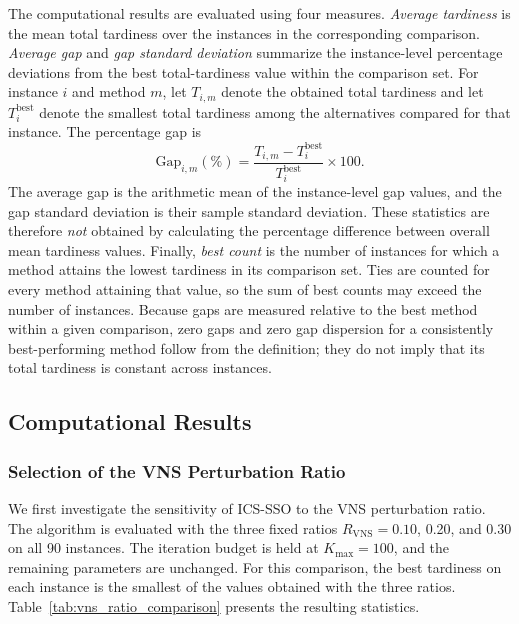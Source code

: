 \documentclass[11pt]{article}
\begin{document}
The computational results are evaluated using four measures. \emph{Average tardiness} is the mean total tardiness over the instances in the corresponding comparison. \emph{Average gap} and \emph{gap standard deviation} summarize the instance-level percentage deviations from the best total-tardiness value within the comparison set. For instance \(i\) and method \(m\), let \(T_{i,m}\) denote the obtained total tardiness and let \(T_i^{\mathrm{best}}\) denote the smallest total tardiness among the alternatives compared for that instance. The percentage gap is
\begin{equation}
\label{eq:gap}
\mathrm{Gap}_{i,m}(\%) = \frac{T_{i,m}-T_i^{\mathrm{best}}}{T_i^{\mathrm{best}}}\times 100.
\end{equation}
The average gap is the arithmetic mean of the instance-level gap values, and the gap standard deviation is their sample standard deviation. These statistics are therefore \emph{not} obtained by calculating the percentage difference between overall mean tardiness values. Finally, \emph{best count} is the number of instances for which a method attains the lowest tardiness in its comparison set. Ties are counted for every method attaining that value, so the sum of best counts may exceed the number of instances. Because gaps are measured relative to the best method within a given comparison, zero gaps and zero gap dispersion for a consistently best-performing method follow from the definition; they do not imply that its total tardiness is constant across instances.

\subsection{Computational Results}
\label{subsec:overall_results}

\subsubsection{Selection of the VNS Perturbation Ratio}
\label{subsubsec:vns_ratio}
\label{subsec:ratio}

We first investigate the sensitivity of ICS-SSO to the VNS perturbation ratio. The algorithm is evaluated with the three fixed ratios \(R_{\mathrm{VNS}}=0.10\), 0.20, and 0.30 on all 90 instances. The iteration budget is held at \(K_{\max}=100\), and the remaining parameters are unchanged. For this comparison, the best tardiness on each instance is the smallest of the values obtained with the three ratios. Table~\ref{tab:vns_ratio_comparison} presents the resulting statistics.
\end{document}
